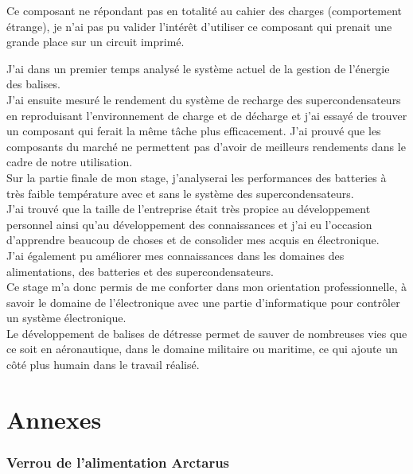 Ce composant ne répondant pas en totalité au cahier des charges (comportement étrange), je  n'ai pas pu valider l'intérêt d'utiliser ce composant qui prenait une grande place sur un circuit imprimé.


J'ai dans un premier temps analysé le système actuel de la gestion de l'énergie des balises. \\
J'ai ensuite mesuré le rendement du système de recharge des supercondensateurs en reproduisant l'environnement de charge et de décharge et j'ai essayé de trouver un composant qui ferait la même tâche plus efficacement. J'ai prouvé que les composants du marché ne permettent pas d'avoir de meilleurs rendements dans le cadre de notre utilisation.\\

Sur la partie finale de mon stage, j'analyserai les performances des batteries à très faible température  avec et sans le système des supercondensateurs.\\


J’ai trouvé que la taille de l’entreprise était très propice au développement personnel ainsi qu’au développement des connaissances et j’ai eu l’occasion d’apprendre beaucoup de choses et de consolider mes acquis en électronique.\\
J'ai également pu améliorer mes connaissances dans les domaines des alimentations, des batteries et des supercondensateurs. \\

Ce stage m'a donc permis de me conforter dans mon orientation professionnelle, à savoir le domaine de l'électronique avec une partie d'informatique pour contrôler un système électronique.\\


Le développement de balises de détresse permet de sauver de nombreuses vies que ce soit en aéronautique, dans le domaine militaire ou maritime, ce qui ajoute un côté plus humain dans le travail réalisé.\\
\chapter{Annexes}

\subsection{Verrou de l'alimentation Arctarus}


